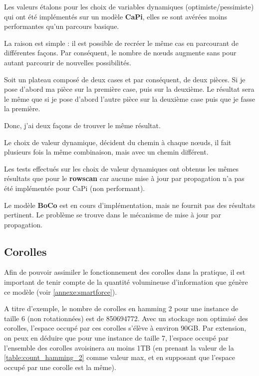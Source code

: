 	Les valeurs étalons pour les choix de variables dynamiques (optimiste/pessimiste) qui ont été implémentés sur un modèle \textbf{CaPi}, elles se sont avérées moins performantes qu'un parcours basique.
	
	La raison est simple : il est possible de recréer le même cas en parcourant de différentes façons. Par conséquent, le nombre de n\oe uds augmente sans pour autant parcourir de nouvelles possibilités.
	
	\begin{exmp}
		Soit un plateau composé de deux cases et par conséquent, de deux pièces. Si je pose d'abord ma pièce sur la première case, puis sur la deuxième. Le résultat sera le même que si je pose d'abord l'autre pièce sur la deuxième case puis que je fasse la première.
		
		Donc, j'ai deux façons de trouver le même résultat.
	\end{exmp}
	
	Le choix de valeur dynamique, décident du chemin à chaque n\oe uds, il fait plusieurs fois la même combinaison, mais avec un chemin différent.
	
	Les tests effectués sur les choix de valeur dynamiques ont obtenus les mêmes résultats que pour le \textbf{rowscan} car aucune mise à jour par propagation n'a pas été implémentée pour CaPi (non performant).
	
	Le modèle \textbf{BoCo} est en cours d'implémentation, mais ne fournit pas des résultats pertinent. Le problème se trouve dans le mécanisme de mise à jour par propagation.
	
	\subsection{Corolles}
	
	Afin de pouvoir assimiler le fonctionnement des corolles dans la pratique, il est important de tenir compte de la quantité volumineuse d'information que génère ce modèle (voir \autoref{annexe:smartforce}).
	
	A titre d'exemple, le nombre de corolles en hamming 2 pour une instance de taille 6 (non rotationnées) est de 850694772. Avec un stockage non optimisé des corolles, l'espace occupé par ces corolles s'élève à environ 90GB.
	Par extension, on peux en déduire que pour une instance de taille 7, l'espace occupé par l'ensemble des corolles avoisinera au moins 1TB (en prenant la valeur de la \autoref{table:count_hamming_2} comme valeur max, et en supposant que l'espace occupé par une corolle est la même).
	
